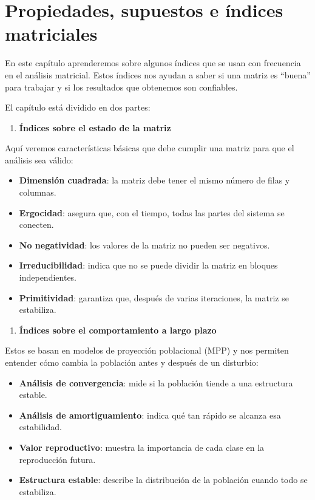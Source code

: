 \documentclass[
  12pt,
  letterpaper,
]{book}
\providecommand{\tightlist}{%
  \setlength{\itemsep}{0pt}\setlength{\parskip}{0pt}}\usepackage{longtable,booktabs,array}
\begin{document}
\section{Propiedades, supuestos e índices
matriciales}\label{propiedades-supuestos-e-uxedndices-matriciales}

En este capítulo aprenderemos sobre algunos índices que se usan con
frecuencia en el análisis matricial. Estos índices nos ayudan a saber si
una matriz es ``buena'' para trabajar y si los resultados que obtenemos
son confiables.

El capítulo está dividido en dos partes:

\begin{enumerate}
\def\labelenumi{\arabic{enumi}.}
\tightlist
\item
  \textbf{Índices sobre el estado de la matriz}
\end{enumerate}

Aquí veremos características básicas que debe cumplir una matriz para
que el análisis sea válido:

\begin{itemize}
\tightlist
\item
  \textbf{Dimensión cuadrada}: la matriz debe tener el mismo número de
  filas y columnas.
\item
  \textbf{Ergocidad}: asegura que, con el tiempo, todas las partes del
  sistema se conecten.
\item
  \textbf{No negatividad}: los valores de la matriz no pueden ser
  negativos.
\item
  \textbf{Irreducibilidad}: indica que no se puede dividir la matriz en
  bloques independientes.
\item
  \textbf{Primitividad}: garantiza que, después de varias iteraciones,
  la matriz se estabiliza.
\end{itemize}

\begin{enumerate}
\def\labelenumi{\arabic{enumi}.}
\setcounter{enumi}{1}
\tightlist
\item
  \textbf{Índices sobre el comportamiento a largo plazo}
\end{enumerate}

Estos se basan en modelos de proyección poblacional (MPP) y nos permiten
entender cómo cambia la población antes y después de un disturbio:

\begin{itemize}
\tightlist
\item
  \textbf{Análisis de convergencia}: mide si la población tiende a una
  estructura estable.
\item
  \textbf{Análisis de amortiguamiento}: indica qué tan rápido se alcanza
  esa estabilidad.
\item
  \textbf{Valor reproductivo}: muestra la importancia de cada clase en
  la reproducción futura.
\item
  \textbf{Estructura estable}: describe la distribución de la población
  cuando todo se estabiliza.
\end{itemize}
\end{document}
